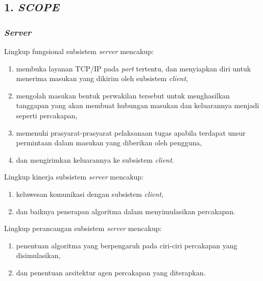 \subsection*{\textcolor{subsectioncolor}{\textsf{1. \textit{SCOPE}}}}

\subsubsection*{\textit{Server}}
Lingkup fungsional subsistem \textit{server} mencakup:
\begin{enumerate}
\item membuka layanan TCP/IP pada \textit{port} tertentu, dan menyiapkan diri untuk menerima masukan yang dikirim oleh subsistem \textit{client},
\item mengolah masukan bentuk perwakilan tersebut untuk menghasilkan tanggapan yang akan membuat hubungan masukan dan keluarannya menjadi seperti percakapan,
\item memenuhi prasyarat-prasyarat pelaksanaan tugas apabila terdapat unsur permintaan dalam masukan yang diberikan oleh pengguna,
\item dan mengirimkan keluarannya ke subsistem \textit{client}.
\end{enumerate}
Lingkup kinerja subsistem \textit{server} mencakup:
\begin{enumerate}
\item keluwesan komunikasi dengan subsistem \textit{client}, %
\item dan baiknya penerapan algoritma dalam menyimulasikan percakapan.
\end{enumerate}
Lingkup perancangan subsistem \textit{server} mencakup:
\begin{enumerate}
\item penentuan algoritma yang berpengaruh pada ciri-ciri percakapan yang disimulasikan,
\item dan penentuan arsitektur agen percakapan yang diterapkan.
\end{enumerate}

